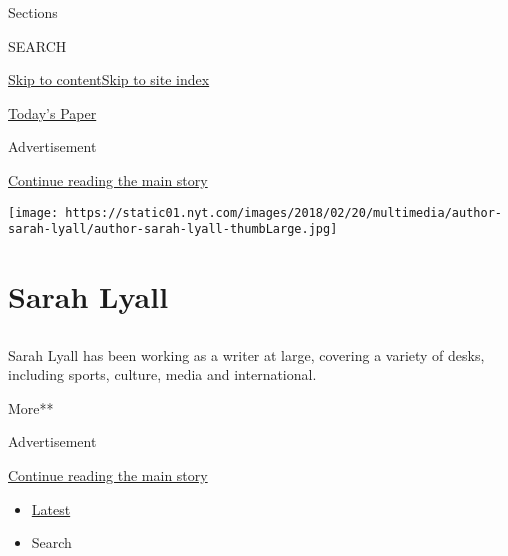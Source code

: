Sections

SEARCH

\protect\hyperlink{site-content}{Skip to
content}\protect\hyperlink{site-index}{Skip to site index}

\href{https://myaccount.nytimes.com/auth/login?response_type=cookie\&client_id=vi}{}

\href{https://www.nytimes.com/section/todayspaper}{Today's Paper}

Advertisement

\protect\hyperlink{after-top}{Continue reading the main story}

\texttt{[image: https://static01.nyt.com/images/2018/02/20/multimedia/author-sarah-lyall/author-sarah-lyall-thumbLarge.jpg]}

\hypertarget{sarah-lyall}{%
\section{Sarah Lyall}\label{sarah-lyall}}

\subsection{}

Sarah Lyall has been working as a writer at large, covering a variety of
desks, including sports, culture, media and international.

More**

Advertisement

\protect\hyperlink{after-mid1}{Continue reading the main story}

\begin{itemize}
\tightlist
\item
  \protect\hyperlink{stream-panel}{Latest}
\item
  Search
\end{itemize}

